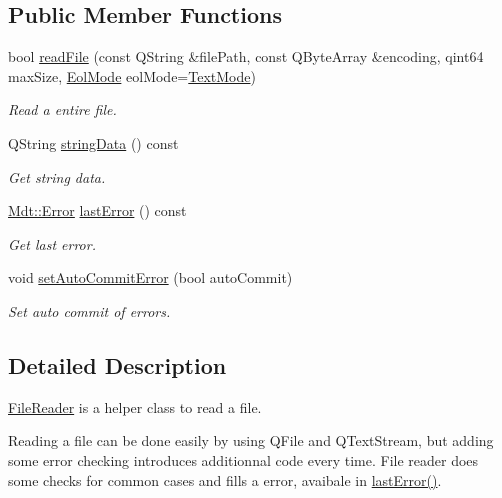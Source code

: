 \subsection*{Public Member Functions}
\begin{DoxyCompactItemize}
\item 
bool \hyperlink{class_mdt_1_1_plain_text_1_1_file_reader_ae382363945e70dd800d5a9a41442795f}{read\+File} (const Q\+String \&file\+Path, const Q\+Byte\+Array \&encoding, qint64 max\+Size, \hyperlink{class_mdt_1_1_plain_text_1_1_file_reader_ad9b4b7e046f899c9d13e19434d68ef10}{Eol\+Mode} eol\+Mode=\hyperlink{class_mdt_1_1_plain_text_1_1_file_reader_ad9b4b7e046f899c9d13e19434d68ef10a80c0cede59c86d5daac618c3efd559cd}{Text\+Mode})
\begin{DoxyCompactList}\small\item\em Read a entire file. \end{DoxyCompactList}\item 
Q\+String \hyperlink{class_mdt_1_1_plain_text_1_1_file_reader_a9453c731da657581d58188106461e32b}{string\+Data} () const 
\begin{DoxyCompactList}\small\item\em Get string data. \end{DoxyCompactList}\item 
\hyperlink{class_mdt_1_1_error}{Mdt\+::\+Error} \hyperlink{class_mdt_1_1_plain_text_1_1_file_reader_aa74ba00e8fad5c4834dc63a354416192}{last\+Error} () const 
\begin{DoxyCompactList}\small\item\em Get last error. \end{DoxyCompactList}\item 
void \hyperlink{class_mdt_1_1_plain_text_1_1_file_reader_a3183d1d629a19353d3d0e1c2a238cc2f}{set\+Auto\+Commit\+Error} (bool auto\+Commit)
\begin{DoxyCompactList}\small\item\em Set auto commit of errors. \end{DoxyCompactList}\end{DoxyCompactItemize}


\subsection{Detailed Description}
\hyperlink{class_mdt_1_1_plain_text_1_1_file_reader}{File\+Reader} is a helper class to read a file. 

Reading a file can be done easily by using Q\+File and Q\+Text\+Stream, but adding some error checking introduces additionnal code every time. File reader does some checks for common cases and fills a error, avaibale in \hyperlink{class_mdt_1_1_plain_text_1_1_file_reader_aa74ba00e8fad5c4834dc63a354416192}{last\+Error()}.

